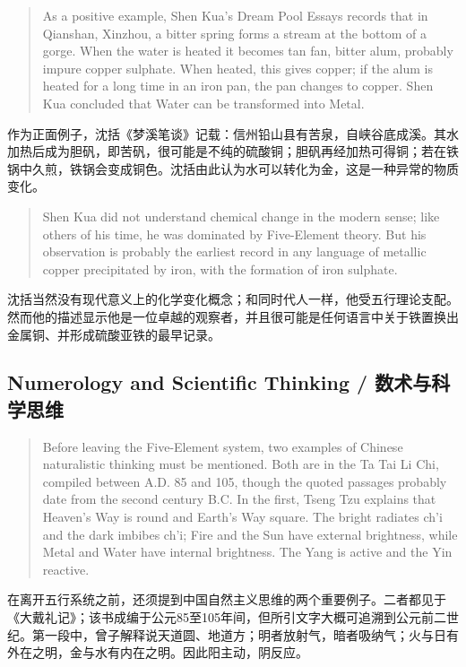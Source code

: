 \documentclass[UTF8,zihao=-4]{ctexart}
\newenvironment{enblock}
  {\par\smallskip\noindent{\scriptsize\bfseries English}\par\begin{quote}\small}
  {\end{quote}}
\newenvironment{zhblock}
  {\par\noindent{\scriptsize\bfseries 中文}\par}
  {\par\medskip}
\begin{document}
\begin{enblock}
As a positive example, Shen Kua's Dream Pool Essays records that in Qianshan, Xinzhou, a bitter spring forms a stream at the bottom of a gorge. When the water is heated it becomes tan fan, bitter alum, probably impure copper sulphate. When heated, this gives copper; if the alum is heated for a long time in an iron pan, the pan changes to copper. Shen Kua concluded that Water can be transformed into Metal.
\end{enblock}
\begin{zhblock}
作为正面例子，沈括《梦溪笔谈》记载：信州铅山县有苦泉，自峡谷底成溪。其水加热后成为胆矾，即苦矾，很可能是不纯的硫酸铜；胆矾再经加热可得铜；若在铁锅中久煎，铁锅会变成铜色。沈括由此认为水可以转化为金，这是一种异常的物质变化。
\end{zhblock}

\begin{enblock}
Shen Kua did not understand chemical change in the modern sense; like others of his time, he was dominated by Five-Element theory. But his observation is probably the earliest record in any language of metallic copper precipitated by iron, with the formation of iron sulphate.
\end{enblock}
\begin{zhblock}
沈括当然没有现代意义上的化学变化概念；和同时代人一样，他受五行理论支配。然而他的描述显示他是一位卓越的观察者，并且很可能是任何语言中关于铁置换出金属铜、并形成硫酸亚铁的最早记录。
\end{zhblock}

\subsection*{Numerology and Scientific Thinking / 数术与科学思维}

\begin{enblock}
Before leaving the Five-Element system, two examples of Chinese naturalistic thinking must be mentioned. Both are in the Ta Tai Li Chi, compiled between A.D. 85 and 105, though the quoted passages probably date from the second century B.C. In the first, Tseng Tzu explains that Heaven's Way is round and Earth's Way square. The bright radiates ch'i and the dark imbibes ch'i; Fire and the Sun have external brightness, while Metal and Water have internal brightness. The Yang is active and the Yin reactive.
\end{enblock}
\begin{zhblock}
在离开五行系统之前，还须提到中国自然主义思维的两个重要例子。二者都见于《大戴礼记》；该书成编于公元85至105年间，但所引文字大概可追溯到公元前二世纪。第一段中，曾子解释说天道圆、地道方；明者放射气，暗者吸纳气；火与日有外在之明，金与水有内在之明。因此阳主动，阴反应。
\end{zhblock}
\end{document}
